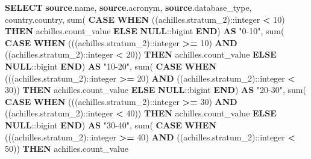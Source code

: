 \documentclass[
]{book}
\newenvironment{Shaded}{\begin{snugshade}}{\end{snugshade}}
\newcommand{\CharTok}[1]{\textcolor[rgb]{0.31,0.60,0.02}{#1}}
\newcommand{\ControlFlowTok}[1]{\textcolor[rgb]{0.13,0.29,0.53}{\textbf{#1}}}
\newcommand{\DecValTok}[1]{\textcolor[rgb]{0.00,0.00,0.81}{#1}}
\newcommand{\FunctionTok}[1]{\textcolor[rgb]{0.00,0.00,0.00}{#1}}
\newcommand{\KeywordTok}[1]{\textcolor[rgb]{0.13,0.29,0.53}{\textbf{#1}}}
\newcommand{\NormalTok}[1]{#1}
\newcommand{\OperatorTok}[1]{\textcolor[rgb]{0.81,0.36,0.00}{\textbf{#1}}}
\newcommand{\OtherTok}[1]{\textcolor[rgb]{0.56,0.35,0.01}{#1}}
\begin{document}
\begin{Shaded}
\begin{Highlighting}[]
\KeywordTok{SELECT} \KeywordTok{source}\NormalTok{.name,}
   \KeywordTok{source}\NormalTok{.acronym,}
   \KeywordTok{source}\NormalTok{.database\_type,}
\NormalTok{   country.country,}
   \FunctionTok{sum}\NormalTok{(}
       \ControlFlowTok{CASE}
           \ControlFlowTok{WHEN}\NormalTok{ ((achilles.stratum\_2):}\CharTok{:integer} \OperatorTok{\textless{}} \DecValTok{10}\NormalTok{) }\ControlFlowTok{THEN}\NormalTok{ achilles.count\_value}
           \ControlFlowTok{ELSE} \KeywordTok{NULL}\NormalTok{:}\CharTok{:bigint}
       \ControlFlowTok{END}\NormalTok{) }\KeywordTok{AS} \OtherTok{"0{-}10"}\NormalTok{,}
   \FunctionTok{sum}\NormalTok{(}
       \ControlFlowTok{CASE}
           \ControlFlowTok{WHEN}\NormalTok{ (((achilles.stratum\_2):}\CharTok{:integer} \OperatorTok{\textgreater{}=} \DecValTok{10}\NormalTok{) }\KeywordTok{AND}\NormalTok{ ((achilles.stratum\_2):}\CharTok{:integer} \OperatorTok{\textless{}} \DecValTok{20}\NormalTok{)) }\ControlFlowTok{THEN}\NormalTok{ achilles.count\_value}
           \ControlFlowTok{ELSE} \KeywordTok{NULL}\NormalTok{:}\CharTok{:bigint}
       \ControlFlowTok{END}\NormalTok{) }\KeywordTok{AS} \OtherTok{"10{-}20"}\NormalTok{,}
   \FunctionTok{sum}\NormalTok{(}
       \ControlFlowTok{CASE}
           \ControlFlowTok{WHEN}\NormalTok{ (((achilles.stratum\_2):}\CharTok{:integer} \OperatorTok{\textgreater{}=} \DecValTok{20}\NormalTok{) }\KeywordTok{AND}\NormalTok{ ((achilles.stratum\_2):}\CharTok{:integer} \OperatorTok{\textless{}} \DecValTok{30}\NormalTok{)) }\ControlFlowTok{THEN}\NormalTok{ achilles.count\_value}
           \ControlFlowTok{ELSE} \KeywordTok{NULL}\NormalTok{:}\CharTok{:bigint}
       \ControlFlowTok{END}\NormalTok{) }\KeywordTok{AS} \OtherTok{"20{-}30"}\NormalTok{,}
   \FunctionTok{sum}\NormalTok{(}
       \ControlFlowTok{CASE}
           \ControlFlowTok{WHEN}\NormalTok{ (((achilles.stratum\_2):}\CharTok{:integer} \OperatorTok{\textgreater{}=} \DecValTok{30}\NormalTok{) }\KeywordTok{AND}\NormalTok{ ((achilles.stratum\_2):}\CharTok{:integer} \OperatorTok{\textless{}} \DecValTok{40}\NormalTok{)) }\ControlFlowTok{THEN}\NormalTok{ achilles.count\_value}
           \ControlFlowTok{ELSE} \KeywordTok{NULL}\NormalTok{:}\CharTok{:bigint}
       \ControlFlowTok{END}\NormalTok{) }\KeywordTok{AS} \OtherTok{"30{-}40"}\NormalTok{,}
   \FunctionTok{sum}\NormalTok{(}
       \ControlFlowTok{CASE}
           \ControlFlowTok{WHEN}\NormalTok{ (((achilles.stratum\_2):}\CharTok{:integer} \OperatorTok{\textgreater{}=} \DecValTok{40}\NormalTok{) }\KeywordTok{AND}\NormalTok{ ((achilles.stratum\_2):}\CharTok{:integer} \OperatorTok{\textless{}} \DecValTok{50}\NormalTok{)) }\ControlFlowTok{THEN}\NormalTok{ achilles.count\_value}

\end{Highlighting}
\end{Shaded}
\end{document}
